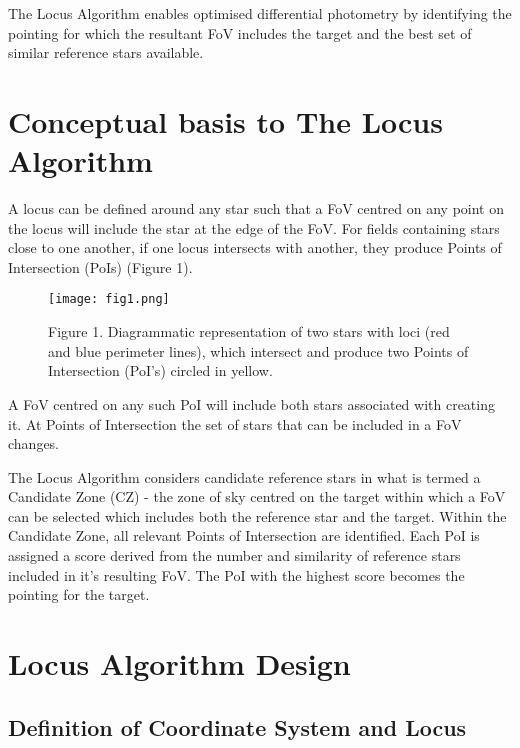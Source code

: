 \documentclass[]{elsarticle} %
\makeatletter
\def\maxwidth{\ifdim\Gin@nat@width>\linewidth\linewidth
\else\Gin@nat@width\fi}
\let\Oldincludegraphics\includegraphics
\renewcommand{\includegraphics}[1]{\Oldincludegraphics[width=\maxwidth]{#1}}
\makeatother
\begin{document}
The Locus Algorithm enables optimised differential photometry by
identifying the pointing for which the resultant FoV includes the target
and the best set of similar reference stars available.

\hypertarget{conceptual-basis-to-the-locus-algorithm}{%
\section{Conceptual basis to The Locus
Algorithm}\label{conceptual-basis-to-the-locus-algorithm}}

A locus can be defined around any star such that a FoV centred on any
point on the locus will include the star at the edge of the FoV. For
fields containing stars close to one another, if one locus intersects
with another, they produce Points of Intersection (PoIs) (Figure 1).

\begin{figure}
\centering
\texttt{[image: fig1.png]}
\caption{Figure 1. Diagrammatic representation of two stars with loci
(red and blue perimeter lines), which intersect and produce two Points
of Intersection (PoI's) circled in yellow.}
\end{figure}

A FoV centred on any such PoI will include both stars associated with
creating it. At Points of Intersection the set of stars that can be
included in a FoV changes.

The Locus Algorithm considers candidate reference stars in what is
termed a Candidate Zone (CZ) - the zone of sky centred on the target
within which a FoV can be selected which includes both the reference
star and the target. Within the Candidate Zone, all relevant Points of
Intersection are identified. Each PoI is assigned a score derived from
the number and similarity of reference stars included in it's resulting
FoV. The PoI with the highest score becomes the pointing for the target.

\hypertarget{locus-algorithm-design}{%
\section{Locus Algorithm Design}\label{locus-algorithm-design}}

\hypertarget{definition-of-coordinate-system-and-locus}{%
\subsection{Definition of Coordinate System and
Locus}\label{definition-of-coordinate-system-and-locus}}
\end{document}
